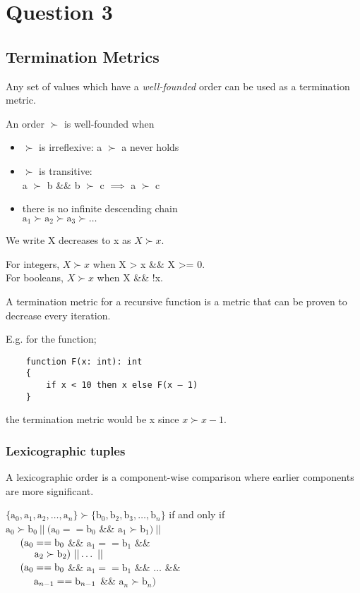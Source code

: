 \section{Question 3}
\subsection{Termination Metrics}
Any set of values which have a \textit{well-founded} order can be used as a termination metric.

An order $\succ$ is well-founded when
\begin{itemize}
    \item $\succ$ is irreflexive: a $\succ$ a never holds
    \item $\succ$ is transitive:\\
        \tab a $\succ$ b \&\& b $\succ$ c $\implies$ a $\succ$ c
    \item there is no infinite descending chain\\
        \tab $\text{a}_1 \succ \text{a}_2  \succ \text{a}_3  \succ \dots$
\end{itemize}

We write X decreases to x as $X \succ x$.

For integers, $X \succ x$ when X > x \&\& X >= 0. \\
For booleans, $X \succ x$ when X \&\& !x.

A termination metric for a recursive function is a metric that can be proven to decrease every iteration.

E.g. for the function;
\begin{verbatim}
    function F(x: int): int 
    { 
        if x < 10 then x else F(x – 1)
    }
\end{verbatim}
the termination metric would be x since $x \succ x - 1$.

\subsubsection{Lexicographic tuples}
A lexicographic order is a component-wise comparison where earlier components are more significant.

$\{\text{a}_0, \text{a}_1, \text{a}_2, \dots, \text{a}_n\} \succ \{\text{b}_0, \text{b}_2, \text{b}_3, \dots, \text{b}_n\}$ if and only if\\
$\text{a}_0 \succ \text{b}_0\ ||\ (\text{a}_0 == \text{b}_0$ \&\& $\text{a}_1 \succ \text{b}_1)\ ||$\\
$\hspace*{0.5cm} (\text{a}_0 == \text{b}_0$ \&\& $\text{a}_1 == \text{b}_1$ \&\&\\
$\tab \tab \text{a}_2 \succ \text{b}_2)\ || \dots\ ||$\\
$\hspace*{0.5cm} (\text{a}_0 == \text{b}_0$ \&\& $\text{a}_1 == \text{b}_1$ \&\& $\dots$ \&\&\\
$\tab \tab \text{a}_{n-1} == \text{b}_{n-1}$ \&\& $\text{a}_n \succ \text{b}_n)$

